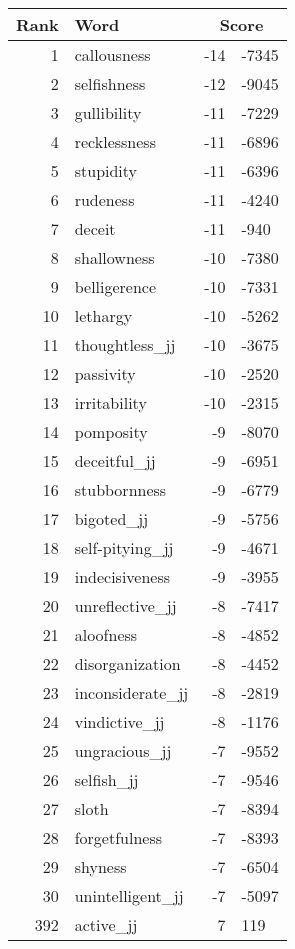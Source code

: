 \begin{longtable}[!htbp]{| rlr@{.}l |}
    \hline
    \textbf{Rank} & \textbf{Word} & \multicolumn{2}{c|}{\textbf{Score}} \\
    \hline
    \endhead
    1 & callousness & -14 & -7345 \\
    2 & selfishness & -12 & -9045 \\
    3 & gullibility & -11 & -7229 \\
    4 & recklessness & -11 & -6896 \\
    5 & stupidity & -11 & -6396 \\
    6 & rudeness & -11 & -4240 \\
    7 & deceit & -11 & -940 \\
    8 & shallowness & -10 & -7380 \\
    9 & belligerence & -10 & -7331 \\
    10 & lethargy & -10 & -5262 \\
    11 & thoughtless\_jj & -10 & -3675 \\
    12 & passivity & -10 & -2520 \\
    13 & irritability & -10 & -2315 \\
    14 & pomposity & -9 & -8070 \\
    15 & deceitful\_jj & -9 & -6951 \\
    16 & stubbornness & -9 & -6779 \\
    17 & bigoted\_jj & -9 & -5756 \\
    18 & self-pitying\_jj & -9 & -4671 \\
    19 & indecisiveness & -9 & -3955 \\
    20 & unreflective\_jj & -8 & -7417 \\
    21 & aloofness & -8 & -4852 \\
    22 & disorganization & -8 & -4452 \\
    23 & inconsiderate\_jj & -8 & -2819 \\
    24 & vindictive\_jj & -8 & -1176 \\
    25 & ungracious\_jj & -7 & -9552 \\
    26 & selfish\_jj & -7 & -9546 \\
    27 & sloth & -7 & -8394 \\
    28 & forgetfulness & -7 & -8393 \\
    29 & shyness & -7 & -6504 \\
    30 & unintelligent\_jj & -7 & -5097 \\
    392 & active\_jj & 7 & 119 \\

\end{longtable}
